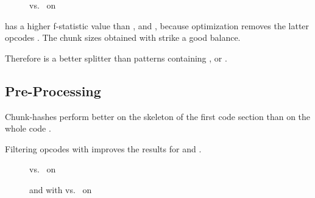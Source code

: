 \documentclass[../main.tex]{subfiles}
\begin{document}
\begin{figure}[ht!]
  \centering
  \caption{ vs.\  on \n{\solcts}}
  \label{fig:solcJumpPpHist}
\end{figure}

\begin{res}
   has a higher f-statistic value than ,  and  , because optimization removes the latter opcodes .
  The chunk sizes obtained with  strike a good balance.
\end{res}
\begin{conc}
  Therefore  is a better splitter than patterns containing ,  or .
\end{conc}

\subsection{Pre-Processing}
\begin{res}
  Chunk-hashes perform better on the skeleton of the first code section than on the whole code .
\end{res}
\begin{res}
  Filtering opcodes with  improves the results for  and  .
\end{res}

\begin{figure}[ht!]
  \centering
  \caption{ vs.\  on }
  \label{fig:wallPpJpSkelRaw}
\end{figure}

\begin{figure}[ht!]
  \centering
  \caption{ and  with  vs.\  on }
  \label{fig:fstSekVsFstatWallets}
\end{figure}
\end{document}
